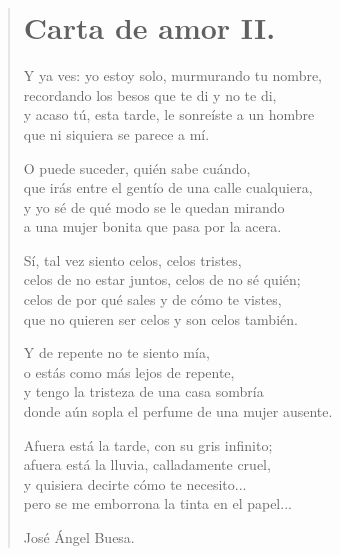\documentclass[11pt, portrait, twoside, notitlepage, openright]{book}
\begin{document}
\doublespacing
\newpage
\begin{verse}
\begin{center}
\section{Carta de amor II.}
\end{center}

Y ya ves: yo estoy solo, murmurando tu nombre,\\
recordando los besos que te di y no te di,\\
y acaso tú, esta tarde, le sonreíste a un hombre\\
que ni siquiera se parece a mí.
\newline

O puede suceder, quién sabe cuándo,\\
que irás entre el gentío de una calle cualquiera,\\
y yo sé de qué modo se le quedan mirando\\
a una mujer bonita que pasa por la acera.
\newline

Sí, tal vez siento celos, celos tristes,\\
celos de no estar juntos, celos de no sé quién;\\
celos de por qué sales y de cómo te vistes,\\
que no quieren ser celos y son celos también.
\newline

Y de repente no te siento mía,\\
o estás como más lejos de repente,\\
y tengo la tristeza de una casa sombría\\
donde aún sopla el perfume de una mujer ausente.
\newpage

Afuera está la tarde, con su gris infinito;\\
afuera está la lluvia, calladamente cruel,\\
y quisiera decirte cómo te necesito...\\
pero se me emborrona la tinta en el papel...
\newline

\begin{flushright}
José Ángel Buesa.
\end{flushright}
\end{verse}
\end{document}
